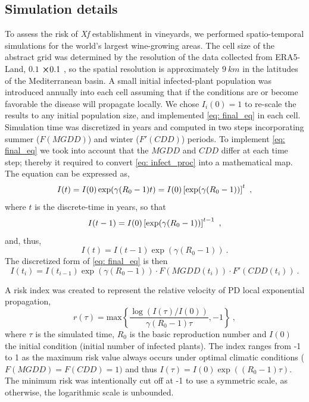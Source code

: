 \subsection{Simulation details}\label{app:risk_index}

To assess the risk of \textit{Xf} establishment in vineyards, we performed
spatio-temporal simulations for the world's largest wine-growing areas. The
cell
size of the abstract grid was determined by the resolution of the data
collected from ERA5-Land, $0.1$ \textdegree $\cross 0.1$ \textdegree , so the
spatial resolution is approximately $\SI{9}{km}$ in the latitudes of the
Mediterranean basin. A small initial infected-plant population was introduced
annually into each cell assuming that if the conditions are or become
favorable the disease will propagate locally. We chose $I_i(0)=1$ to re-scale
the results to any initial population size, and implemented \cref{eq: final_eq}
in each cell. Simulation time was discretized in years and computed in two
steps incorporating summer ($F(MGDD)$) and winter ($F'(CDD)$) periods. To
implement \cref{eq: final_eq} we took into account that the $MGDD$ and $CDD$
differ at each time step; thereby it required to convert \cref{eq: infect_proc}
into a mathematical map. The equation can be expressed as,
\begin{equation}
    I(t)=I(0)\exp(\gamma(R_0-1)t)=I(0)\left[\exp(\gamma(R_0-1))\right]^t \ ,
\end{equation}
where $t$ is the discrete-time in years,
so that
\begin{equation}
    I(t-1)=I(0)\left[\exp(\gamma(R_0-1))\right]^{t-1} \ ,
\end{equation}
and, thus,
\begin{equation}
    I(t)=I(t-1)\exp(\gamma(R_0-1)) \ .
\end{equation}
The discretized form of \cref{eq: final_eq} is then
\begin{equation}
    I(t_i)=I(t_{i-1})\exp(\gamma(R_0-1))\cdot F(MGDD(t_i))\cdot
    F'(CDD(t_i)) \ .
    \label{eq:imapevol}
\end{equation}

A risk index was created to represent the relative velocity of PD local
exponential propagation,
\begin{equation}
    r(\tau)=\textrm{max}\left\{
    \frac{\log(I(\tau)/I(0))}{\gamma(R_0-1)\tau}, -1
    \right\} \ ,
    \label{eq:riskindex}
\end{equation}
where $\tau$ is the simulated time, $R_0$ is the basic reproduction number
and $I(0)$ the initial condition (initial number of infected plants). The index
ranges from -1 to 1 as the maximum risk value always occurs under optimal
climatic conditions ($F(MGDD)=F(CDD)=1)$ and thus
$I(\tau)=I(0)\exp((R_0-1)\tau)$. The minimum risk was intentionally cut off at
-1 to use a symmetric scale, as otherwise, the logarithmic scale is unbounded.

